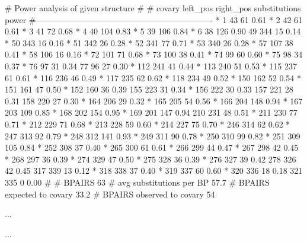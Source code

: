 \begin{sreoutput}
# Power analysis of given structure 
#
# covary  left_pos      right_pos    substitutions      power
#----------------------------------------------------------------
     *    1		43		61		0.61
     *    2		42		61		0.61
     *    3		41		72		0.68
     *    4		40		104		0.83
     *    5		39		106		0.84
     *    6		38		126		0.90
          49		344		15		0.14
     *    50		343		16		0.16
     *    51		342		26		0.28
     *    52		341		77		0.71
     *    53		340		26		0.28
     *    57		107		38		0.41
     *    58		106		16		0.16
     *    72		101		71		0.68
     *    73		100		38		0.41
     *    74		99		60		0.60
     *    75		98		34		0.37
     *    76		97		31		0.34
          77		96		27		0.30
     *    112		241		41		0.44
     *    113		240		51		0.53
     *    115		237		61		0.61
     *    116		236		46		0.49
     *    117		235		62		0.62
     *    118		234		49		0.52
     *    150		162		52		0.54
     *    151		161		47		0.50
     *    152		160		36		0.39
          155		223		31		0.34
     *    156		222		30		0.33
          157		221		28		0.31
          158		220		27		0.30
     *    164		206		29		0.32
     *    165		205		54		0.56
     *    166		204		148		0.94
     *    167		203		109		0.85
     *    168		202		154		0.95
     *    169		201		147		0.94
          210		231		48		0.51
     *    211		230		77		0.71
     *    212		229		71		0.68
     *    213		228		59		0.60
     *    214		227		75		0.70
     *    246		314		62		0.62
     *    247		313		92		0.79
     *    248		312		141		0.93
     *    249		311		90		0.78
     *    250		310		99		0.82
     *    251		309		105		0.84
     *    252		308		37		0.40
     *    265		300		61		0.61
     *    266		299		44		0.47
     *    267		298		42		0.45
     *    268		297		36		0.39
     *    274		329		47		0.50
     *    275		328		36		0.39
     *    276		327		39		0.42
          278		326		42		0.45
          317		339		13		0.12
     *    318		338		37		0.40
     *    319		337		60		0.60
     *    320		336		18		0.18
          321		335		0		0.00
#
# BPAIRS 63
# avg substitutions per BP  57.7
# BPAIRS expected to covary 33.2
# BPAIRS observed to covary 54

  ...

  ...
  

\end{sreoutput}
